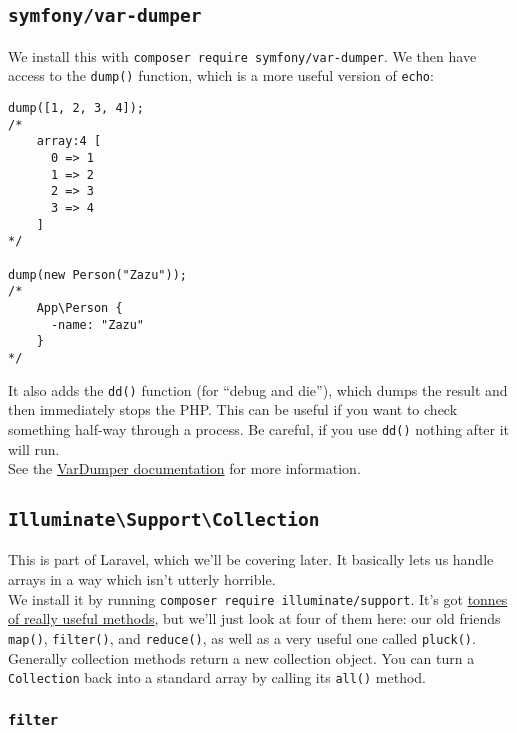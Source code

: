 \subsection{\texttt{symfony/var-dumper}}

We install this with \texttt{composer require symfony/var-dumper}. We then have access to the \texttt{dump()} function, which is a more useful version of \texttt{echo}:

\begin{verbatim}
dump([1, 2, 3, 4]);
/*
    array:4 [
      0 => 1
      1 => 2
      2 => 3
      3 => 4
    ]
*/

dump(new Person("Zazu"));
/*
    App\Person {
      -name: "Zazu"
    }
*/
\end{verbatim}

It also adds the \texttt{dd()} function (for ``debug and die''), which dumps the result and then immediately stops the PHP. This can be useful if you want to check something half-way through a process. Be careful, if you use \texttt{dd()} nothing after it will run.
\\

See the \href{https://symfony.com/doc/current/components/var_dumper.html}{VarDumper documentation} for more information.


\subsection{\texttt{Illuminate\textbackslash Support\textbackslash Collection}}

This is part of Laravel, which we'll be covering later. It basically lets us handle arrays in a way which isn't utterly horrible.
\\

We install it by running \texttt{composer require illuminate/support}. It's got \href{http://laravel.com/docs/master/collections#available-methods}{tonnes of really useful methods}, but we'll just look at four of them here: our old friends \texttt{map()}, \texttt{filter()}, and \texttt{reduce()}, as well as a very useful one called \texttt{pluck()}.
\\

Generally collection methods return a new collection object. You can turn a \texttt{Collection} back into a standard array by calling its \texttt{all()} method.

\subsubsection{\texttt{filter}}

